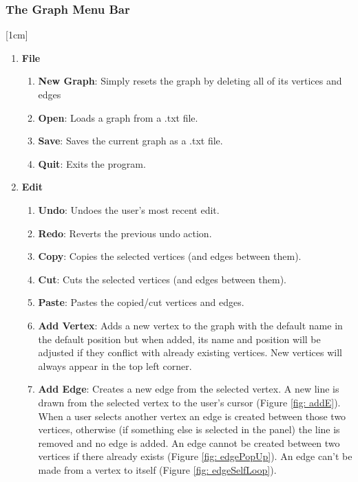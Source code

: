 \documentclass[a4paper]{article}
\begin{document}
\subsubsection{The Graph Menu Bar} 
[1cm]
\begin{enumerate}
    \item \textbf{File}
        \begin{enumerate}[label*=\arabic*.]
            \item \textbf{New Graph}: Simply resets the graph by deleting all of its vertices and edges
            \item \textbf{Open}: Loads a graph from a .txt file.
            \item \textbf{Save}: Saves the current graph as a .txt file.
            \item \textbf{Quit}: Exits the program.
        \end{enumerate}
    \item \textbf{Edit}
        \begin{enumerate}[label*=\arabic*.]
            \item \textbf{Undo}: Undoes the user's most recent edit.
            \item \textbf{Redo}: Reverts the previous undo action.
            \item \textbf{Copy}: Copies the selected vertices (and edges between them).
            \item \textbf{Cut}: Cuts the selected vertices (and edges between them).
            \item \textbf{Paste}: Pastes the copied/cut vertices and edges.
            \item \textbf{Add Vertex}: Adds a new vertex to the graph with the default name in the default position but when added, its name and position will be adjusted if they conflict with already existing vertices. New vertices will always appear in the top left corner.
            \item \textbf{Add Edge}: Creates a new edge from the selected vertex. A new line is drawn from the selected vertex to the user's cursor (Figure \ref{fig: addE}). When a user selects another vertex an edge is created between those two vertices, otherwise (if something else is selected in the panel) the line is removed and no edge is added. An edge cannot be created between two vertices if there already exists (Figure \ref{fig: edgePopUp}). An edge can't be made from a vertex to itself (Figure \ref{fig: edgeSelfLoop}).

\end{enumerate}
\end{enumerate}
\end{document}
